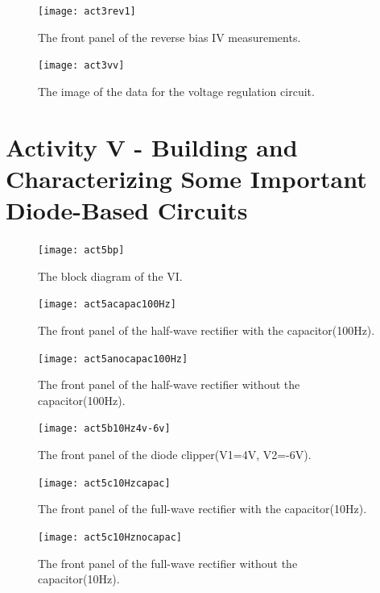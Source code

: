 \documentclass[11pt]{article}
\begin{document}
\begin{figure}[H]
 \begin{center}
  \texttt{[image: act3rev1]}
  \caption{The front panel of the reverse bias IV measurements.}
  \label{fig:act3rev1}
 \end{center}
\end{figure}

\begin{figure}[H]
 \begin{center}
  \texttt{[image: act3vv]}
  \caption{The image of the data for the voltage regulation circuit.}
  \label{fig:act3vv}
 \end{center}
\end{figure}

\section{Activity V - Building and Characterizing Some Important Diode-Based Circuits}

\begin{figure}[H]
 \begin{center}
  \texttt{[image: act5bp]}
  \caption{The block diagram of the VI.}
  \label{fig:act3bp}
 \end{center}
\end{figure}

\begin{figure}[H]
 \begin{center}
  \texttt{[image: act5acapac100Hz]}
  \caption{The front panel of the half-wave rectifier with the capacitor(100Hz).}
  \label{fig:act5acapac100Hz}
 \end{center}
\end{figure}

\begin{figure}[H]
 \begin{center}
  \texttt{[image: act5anocapac100Hz]}
  \caption{The front panel of the half-wave rectifier without the capacitor(100Hz).}
  \label{fig:act5anocapac100Hz}
 \end{center}
\end{figure}

\begin{figure}[H]
 \begin{center}
  \texttt{[image: act5b10Hz4v-6v]}
  \caption{The front panel of the diode clipper(V1=4V, V2=-6V).}
  \label{fig:act5b10Hz4v-6v}
 \end{center}
\end{figure}

\begin{figure}[H]
 \begin{center}
  \texttt{[image: act5c10Hzcapac]}
  \caption{The front panel of the full-wave rectifier with the capacitor(10Hz).}
  \label{fig:act5c10Hzcapac}
 \end{center}
\end{figure}

\begin{figure}[H]
 \begin{center}
  \texttt{[image: act5c10Hznocapac]}
  \caption{The front panel of the full-wave rectifier without the capacitor(10Hz).}
  \label{fig:act5c10Hznocapac}
 \end{center}
\end{figure}
\end{document}
